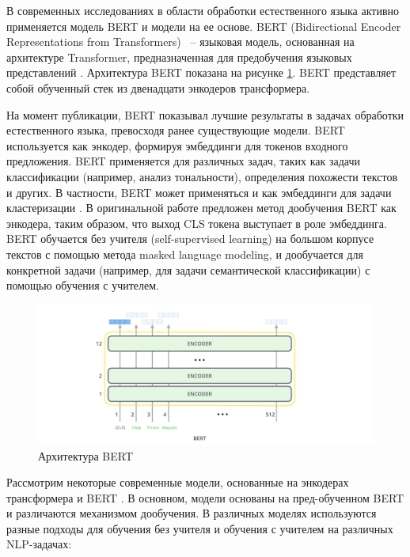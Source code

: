 В современных исследованиях в области обработки естественного языка активно применяется модель BERT и модели на ее основе. BERT (Bidirectional Encoder Representations from Transformers) ~-- языковая модель, основанная на архитектуре Transformer, предназначенная для предобучения языковых представлений \cite{bert}. Архитектура BERT показана на рисунке \ref{img:bert-architecture}. BERT представляет собой обученный стек из двенадцати энкодеров трансформера.

На момент публикации, BERT показывал лучшие результаты в задачах обработки естественного языка, превосходя ранее существующие модели. BERT используется как энкодер, формируя эмбеддинги для токенов входного предложения. BERT применяется для различных задач, таких как задачи классификации (например, анализ тональности), определения похожести текстов и других. В частности, BERT может применяться и как эмбеддинги для задачи кластеризации \cite{text-clustering-with-bert}. В оригинальной работе предложен метод дообучения BERT как энкодера, таким образом, что выход CLS токена выступает в роле эмбеддинга. BERT обучается без учителя (self-supervised learning) на большом корпусе текстов с помощью метода masked language modeling, и дообучается для конкретной задачи (например, для задачи семантической классификации) с помощью обучения с учителем.

\begin{figure}[h]
    \centering
    \includegraphics[width=\linewidth]{images/bert-architecture.png}
    \caption{Архитектура BERT}
    \label{img:bert-architecture}
\end{figure}

Рассмотрим некоторые современные модели, основанные на энкодерах трансформера и BERT \cite{mteb}. В основном, модели основаны на пред-обученном BERT и различаются механизмом дообучения. В различных моделях используются разные подходы для обучения без учителя и обучения с учителем на различных NLP-задачах:


